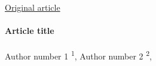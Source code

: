 \underline{Original article}
\\
\\
\textbf{Article title}
\\
\\
Author number 1 \textsuperscript{1},
Author number 2 \textsuperscript{2},
\\
\\
